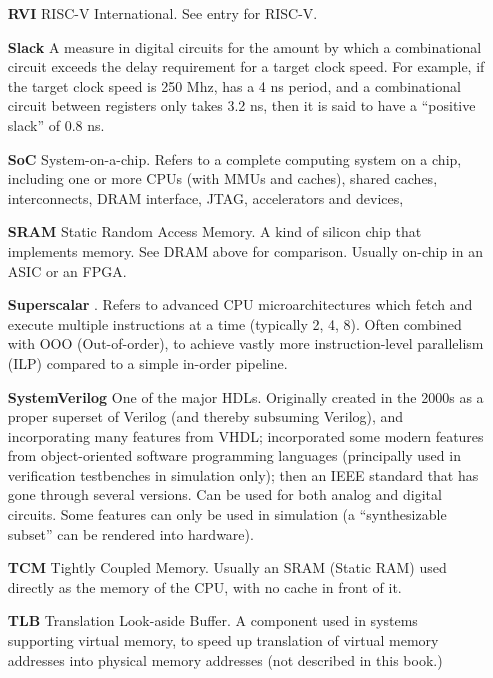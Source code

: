 \begin{itemize}
\item[\bf RVI] RISC-V International.  See entry for RISC-V.

\item[\bf Slack] A measure in digital circuits for the amount by which
  a combinational circuit exceeds the delay requirement for a target
  clock speed.  For example, if the target clock speed is 250 Mhz,
  {\ie} has a 4 ns period, and a combinational circuit between
  registers only takes 3.2 ns, then it is said to have a ``positive
  slack'' of 0.8 ns.

\item[\bf SoC] System-on-a-chip.  Refers to a complete computing
  system on a chip, including one or more CPUs (with MMUs and caches),
  shared caches, interconnects, DRAM interface, JTAG, accelerators and
  devices, {\etc}

\item[\bf SRAM] Static Random Access Memory.  A kind of silicon chip
  that implements memory.  See DRAM above for comparison.  Usually
  on-chip in an ASIC or an FPGA.

\item[\bf Superscalar].  Refers to advanced CPU microarchitectures
  which fetch and execute multiple instructions at a time (typically
  2, 4, 8).  Often combined with OOO (Out-of-order), to achieve vastly
  more instruction-level parallelism (ILP) compared to a simple
  in-order pipeline.

\item[\bf SystemVerilog] One of the major HDLs.  Originally created in
  the 2000s as a proper superset of Verilog (and thereby subsuming
  Verilog), and incorporating many features from VHDL; incorporated
  some modern features from object-oriented software programming
  languages (principally used in verification testbenches in
  simulation only); then an IEEE standard that has gone through
  several versions.  Can be used for both analog and digital circuits.
  Some features can only be used in simulation (a ``synthesizable
  subset'' can be rendered into hardware).

\item[\bf TCM] Tightly Coupled Memory. Usually an SRAM (Static RAM)
  used directly as the memory of the CPU, with no cache in front of
  it.

\item[\bf TLB] Translation Look-aside Buffer.  A component used in
  systems supporting virtual memory, to speed up translation of
  virtual memory addresses into physical memory addresses (not
  described in this book.)


\end{itemize}
